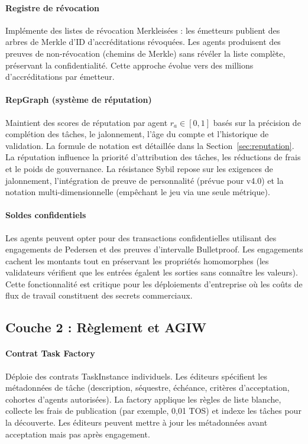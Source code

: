 \documentclass[11pt]{article}
\begin{document}
\paragraph{Registre de révocation} Implémente des listes de révocation Merkleisées : les émetteurs publient des arbres de Merkle d'ID d'accréditations révoquées. Les agents produisent des preuves de non-révocation (chemins de Merkle) sans révéler la liste complète, préservant la confidentialité. Cette approche évolue vers des millions d'accréditations par émetteur.

\paragraph{RepGraph (système de réputation)} Maintient des scores de réputation par agent $r_a \in [0,1]$ basés sur la précision de complétion des tâches, le jalonnement, l'âge du compte et l'historique de validation. La formule de notation est détaillée dans la Section~\ref{sec:reputation}. La réputation influence la priorité d'attribution des tâches, les réductions de frais et le poids de gouvernance. La résistance Sybil repose sur les exigences de jalonnement, l'intégration de preuve de personnalité (prévue pour v4.0) et la notation multi-dimensionnelle (empêchant le jeu via une seule métrique).

\paragraph{Soldes confidentiels} Les agents peuvent opter pour des transactions confidentielles utilisant des engagements de Pedersen et des preuves d'intervalle Bulletproof. Les engagements cachent les montants tout en préservant les propriétés homomorphes (les validateurs vérifient que les entrées égalent les sorties sans connaître les valeurs). Cette fonctionnalité est critique pour les déploiements d'entreprise où les coûts de flux de travail constituent des secrets commerciaux.

\subsection{Couche 2 : Règlement et AGIW}
\paragraph{Contrat Task Factory} Déploie des contrats TaskInstance individuels. Les éditeurs spécifient les métadonnées de tâche (description, séquestre, échéance, critères d'acceptation, cohortes d'agents autorisées). La factory applique les règles de liste blanche, collecte les frais de publication (par exemple, 0,01 TOS) et indexe les tâches pour la découverte. Les éditeurs peuvent mettre à jour les métadonnées avant acceptation mais pas après engagement.
\end{document}
